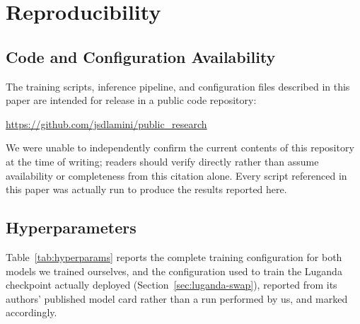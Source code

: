 \documentclass[11pt]{article}
\begin{document}
\section{Reproducibility}
\label{sec:reproducibility}

\subsection{Code and Configuration Availability}
\label{sec:code-availability}

The training scripts, inference pipeline, and configuration files described in this paper are intended for release in a public code repository:

\begin{center}
\url{https://github.com/jsdlamini/public_research}
\end{center}

\noindent We were unable to independently confirm the current contents of this repository at the time of writing; readers should verify directly rather than assume availability or completeness from this citation alone. Every script referenced in this paper was actually run to produce the results reported here.

\subsection{Hyperparameters}

Table~\ref{tab:hyperparams} reports the complete training configuration for both models we trained ourselves, and the configuration used to train the Luganda checkpoint actually deployed (Section~\ref{sec:luganda-swap}), reported from its authors' published model card \cite{waxalbenchmarking2026mms300mlug} rather than a run performed by us, and marked accordingly.
\end{document}
